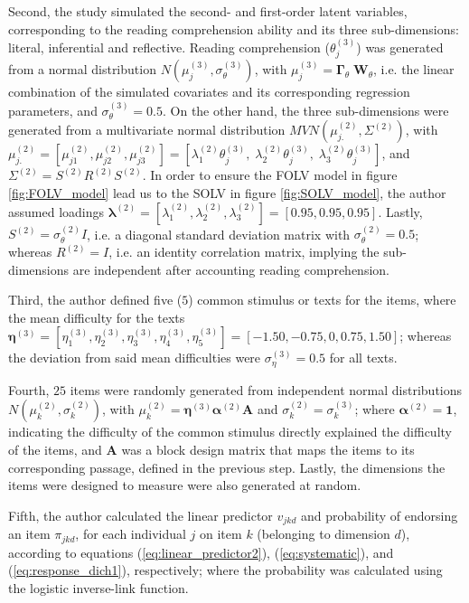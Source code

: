 Second, the study simulated the second- and first-order latent variables, corresponding to the reading comprehension ability and its three sub-dimensions: literal, inferential and reflective. Reading comprehension ($\theta^{(3)}_{j}$) was generated from a normal distribution $N( \mu^{(3)}_{j}, \sigma^{(3)}_{\theta} )$, with $\mu^{(3)}_{j} = \pmb{\Gamma}_{\theta} \; \mathbf{W}_{\theta}$, i.e. the linear combination of the simulated covariates and its corresponding regression parameters, and $\sigma^{(3)}_{\theta}=0.5$. On the other hand, the three sub-dimensions were generated from a multivariate normal distribution $MVN( \mu^{(2)}_{j.} , \Sigma^{(2)})$, with $\mu^{(2)}_{j.} = [\mu^{(2)}_{j1}, \mu^{(2)}_{j2}, \mu^{(2)}_{j3}] = [\lambda^{(2)}_{1} \theta^{(3)}_{j}, \; \lambda^{(2)}_{2} \theta^{(3)}_{j}, \; \lambda^{(2)}_{3} \theta^{(3)}_{j} ]$, and $\Sigma^{(2)} = S^{(2)} R^{(2)} S^{(2)}$. In order to ensure the FOLV model in figure \ref{fig:FOLV_model} lead us to the SOLV in figure \ref{fig:SOLV_model}, the author assumed loadings $\pmb{\lambda}^{(2)} = [\lambda^{(2)}_{1}, \lambda^{(2)}_{2}, \lambda^{(2)}_{3}] = [0.95, 0.95, 0.95]$. Lastly, $S^{(2)} = \sigma^{(2)}_{\theta} I$, i.e. a diagonal standard deviation matrix with $\sigma^{(2)}_{\theta} = 0.5$; whereas $R^{(2)} = I$, i.e. an identity correlation matrix, implying the sub-dimensions are independent after accounting reading comprehension.

Third, the author defined five ($5$) common stimulus or texts for the items, where the mean difficulty for the texts $\pmb{\eta}^{(3)} = [\eta^{(3)}_{1}, \eta^{(3)}_{2}, \eta^{(3)}_{3}, \eta^{(3)}_{4}, \eta^{(3)}_{5}] = [-1.50, -0.75, 0, 0.75, 1.50]$; whereas the deviation from said mean difficulties were $\sigma^{(3)}_{\eta} = 0.5$ for all texts. 

Fourth, $25$ items were randomly generated from independent normal distributions $N( \mu^{(2)}_{k}, \sigma^{(2)}_{k} ) $, with $\mu^{(2)}_{k} = \pmb{\eta}^{(3)} \pmb{\alpha}^{(2)} \mathbf{A}$ and $\sigma^{(2)}_{k} = \sigma^{(3)}_{k}$; where $\pmb{\alpha}^{(2)} = \mathbf{1}$, indicating the difficulty of the common stimulus directly explained the difficulty of the items, and $\mathbf{A}$ was a block design matrix that maps the items to its corresponding passage, defined in the previous step. Lastly, the dimensions the items were designed to measure were also generated at random.

Fifth, the author calculated the linear predictor $v_{jkd}$ and probability of endorsing an item $\pi_{jkd}$, for each individual $j$ on item $k$ (belonging to dimension $d$), according to equations (\ref{eq:linear_predictor2}), (\ref{eq:systematic}), and (\ref{eq:response_dich1}), respectively; where the probability was calculated using the logistic inverse-link function.
	
